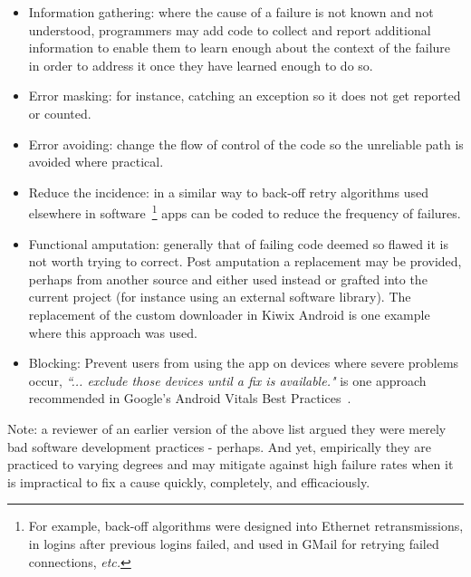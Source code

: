 \begin{itemize}
    \item Information gathering: where the cause of a failure is not known and not understood, programmers may add code to collect and report additional information to enable them to learn enough about the context of the failure in order to address it once they have learned enough to do so.
    \item Error masking: for instance, catching an exception so it does not get reported or counted.
    \item Error avoiding: change the flow of control of the code so the unreliable path is avoided where practical.
    \item Reduce the incidence: in a similar way to back-off retry algorithms used elsewhere in software~\footnote{For example, back-off algorithms were designed into Ethernet retransmissions, in logins after previous logins failed, and used in GMail for retrying failed connections, \emph{etc.}} apps can be coded to reduce the frequency of failures. 
    \item Functional amputation: generally that of failing code deemed so flawed it is not worth trying to correct. Post amputation a replacement may be provided, perhaps from another source and either used instead or grafted into the current project (for instance using an external software library). The replacement of the custom downloader in Kiwix Android is one example where this approach was used.
    \item Blocking: Prevent users from using the app on devices where severe problems occur, \emph{``... exclude those devices until a fix is available."} is one approach recommended in Google's Android Vitals Best Practices~\cite{android_vitals_best_practices}.
\end{itemize}

Note: a reviewer of an earlier version of the above list argued they were merely bad software development practices - perhaps. And yet, empirically they are practiced to varying degrees and may mitigate against high failure rates when it is impractical to fix a cause quickly, completely, and efficaciously.

